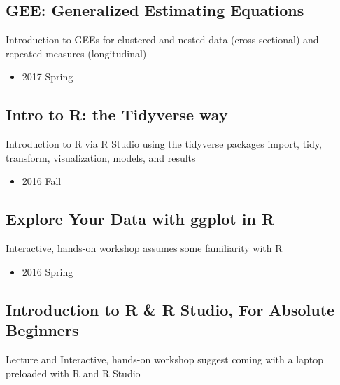 \documentclass[11pt,a4paper,]{moderncv}
\providecommand{\tightlist}{%
	\setlength{\itemsep}{0pt}\setlength{\parskip}{0pt}}
\begin{document}
\hypertarget{gee-generalized-estimating-equations}{%
\subsection{GEE: Generalized Estimating
Equations}\label{gee-generalized-estimating-equations}}

Introduction to GEEs for clustered and nested data (cross-sectional) and
repeated measures (longitudinal)

\begin{itemize}
\tightlist
\item
  2017 Spring
\end{itemize}

\hypertarget{intro-to-r-the-tidyverse-way}{%
\subsection{Intro to R: the Tidyverse
way}\label{intro-to-r-the-tidyverse-way}}

Introduction to R via R Studio using the tidyverse packages import,
tidy, transform, visualization, models, and results

\begin{itemize}
\tightlist
\item
  2016 Fall
\end{itemize}

\hypertarget{explore-your-data-with-ggplot-in-r}{%
\subsection{Explore Your Data with ggplot in
R}\label{explore-your-data-with-ggplot-in-r}}

Interactive, hands-on workshop assumes some familiarity with R

\begin{itemize}
\tightlist
\item
  2016 Spring
\end{itemize}

\hypertarget{introduction-to-r-r-studio-for-absolute-beginners}{%
\subsection{Introduction to R \& R Studio, For Absolute
Beginners}\label{introduction-to-r-r-studio-for-absolute-beginners}}

Lecture and Interactive, hands-on workshop suggest coming with a laptop
preloaded with R and R Studio
\end{document}
